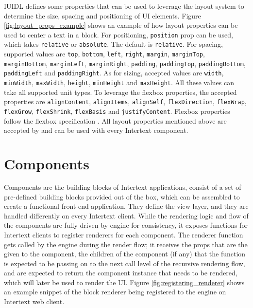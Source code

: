 IUIDL defines some properties that can be used to leverage the layout system to determine the size, spacing and positioning of UI elements. Figure \ref{fig:layout_props_example} shows an example of how layout properties can be used to center a text in a block. For positioning, \texttt{position} prop can be used, which takes \texttt{relative} or \texttt{absolute}. The default is \texttt{relative}. For spacing, supported values are \texttt{top}, \texttt{bottom}, \texttt{left}, \texttt{right}, \texttt{margin}, \texttt{marginTop}, \texttt{marginBottom}, \texttt{marginLeft}, \texttt{marginRight}, \texttt{padding}, \texttt{paddingTop}, \texttt{paddingBottom}, \texttt{paddingLeft} and \newline \texttt{paddingRight}. As for sizing, accepted values are \texttt{width}, \texttt{minWidth}, \texttt{maxWidth}, \texttt{height}, \texttt{minHeight} and \texttt{maxHeight}. All these values can take all supported unit types. To leverage the flexbox properties, the accepted properties are \texttt{alignContent}, \texttt{alignItems}, \texttt{alignSelf}, \texttt{flexDirection}, \texttt{flexWrap}, \texttt{flexGrow}, \texttt{flexShrink}, \texttt{flexBasis} and \texttt{justifyContent}. Flexbox properties follow the flexbox specification \cite{FlexSpec1} \cite{FlexSpec2}. All layout properties mentioned above are accepted by and can be used with every Intertext component.

\section{Components}

Components are the building blocks of Intertext applications, consist of a set of pre-defined building blocks provided out of the box, which can be assembled to create a functional front-end application. They define the view layer, and they are handled differently on every Intertext client. While the rendering logic and flow of the components are fully driven by engine for consistency, it exposes functions for Intertext clients to register renderers for each component. The renderer function gets called by the engine during the render flow; it receives the props that are the given to the component, the children of the component (if any) that the function is expected to be passing on to the next call level of the recursive rendering flow, and are expected to return the component instance that needs to be rendered, which will later be used to render the UI. Figure \ref{fig:registering_renderer} shows an example snippet of the block renderer being registered to the engine on Intertext web client.

